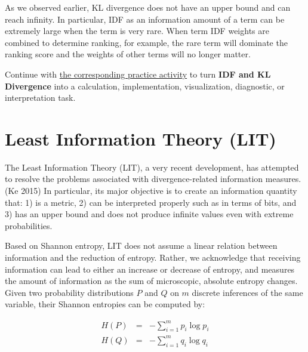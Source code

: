 \documentclass[
  letterpaper,
]{scrbook}
\begin{document}
As we observed earlier, KL divergence does not have an upper bound and
can reach infinity. In particular, IDF as an information amount of a
term can be extremely large when the term is very rare. When term IDF
weights are combined to determine ranking, for example, the rare term
will dominate the ranking score and the weights of other terms will no
longer matter.

\begin{tcolorbox}[enhanced jigsaw, arc=.35mm, bottomrule=.15mm, bottomtitle=1mm, breakable, colback=white, colbacktitle=quarto-callout-tip-color!10!white, colframe=quarto-callout-tip-color-frame, coltitle=black, left=2mm, leftrule=.75mm, opacityback=0, opacitybacktitle=0.6, rightrule=.15mm, title=\textcolor{quarto-callout-tip-color}{\faLightbulb}\hspace{0.5em}{Put it into practice}, titlerule=0mm, toprule=.15mm, toptitle=1mm]

Continue with \hyperref[sec-pr-05-idf-and-kl-divergence]{the
corresponding practice activity} to turn \textbf{IDF and KL Divergence}
into a calculation, implementation, visualization, diagnostic, or
interpretation task.

\end{tcolorbox}

\section{Least Information Theory (LIT)}\label{ch-info-lit}

The Least Information Theory (LIT), a very recent development, has
attempted to resolve the problems associated with divergence-related
information measures.(Ke 2015) In particular, its major objective is to
create an information quantity that: 1) is a metric, 2) can be
interpreted properly such as in terms of bits, and 3) has an upper bound
and does not produce infinite values even with extreme probabilities.

Based on Shannon entropy, LIT does not assume a linear relation between
information and the reduction of entropy. Rather, we acknowledge that
receiving information can lead to either an increase or decrease of
entropy, and measures the amount of information as the sum of
microscopic, absolute entropy changes. Given two probability
distributions \(P\) and \(Q\) on \(m\) discrete inferences of the same
variable, their Shannon entropies can be computed by:

\[\begin{aligned}
  H(P) & = & - \sum_{i=1}^{m} p_i \log p_i \\
  H(Q) & = & - \sum_{i=1}^{m} q_i \log q_i
\end{aligned}\]
\end{document}
